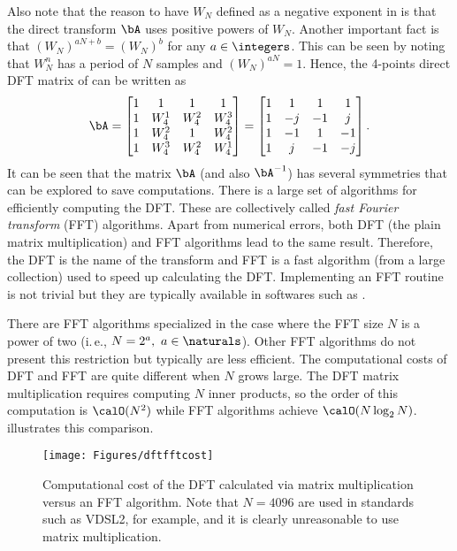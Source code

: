 Also note that the reason to have $W_N$ defined as a negative exponent in  is that the direct transform $\bA$ uses positive powers of $W_N$.
Another important fact is that $(W_N)^{aN+b}=(W_N)^{b}$ for any $a \in \integers$. This can be seen by noting that $W_N^n$ has a period of $N$ samples and $(W_N)^{aN} = 1$. Hence, the 4-points direct DFT matrix of  can be written as
\[\bA = 
    \begin{bmatrix}
    1 & 1 & 1 & 1\\
    1 & W_4^{1} & W_4^{2} & W_4^{3} \\
    1 & W_4^{2} & 1 & W_4^{2} \\
    1 & W_4^{3} & W_4^{2} & W_4^{1} \\
    \end{bmatrix}
=
    \begin{bmatrix}
    1 & 1 & 1 & 1\\
    1 & -j & -1 & j \\
    1 & -1 & 1 & -1 \\
    1 & j & -1 & -j \\
    \end{bmatrix}
.\]
It can be seen that the matrix $\bA$ (and also $\bA^{-1}$) has several symmetries that can be explored to save computations. There is a large set of algorithms for efficiently computing the DFT. These are collectively called \emph{fast Fourier transform} (FFT) algorithms.
Apart from numerical errors, both DFT (the plain matrix multiplication) and FFT algorithms lead to the same result.  Therefore, the DFT is the name of the transform and FFT is a fast algorithm (from a large collection) used to speed up calculating the DFT. Implementing an FFT routine is not trivial but they are typically available in softwares such as {\matlab}. 

There are FFT algorithms specialized in the case where the FFT size $N$ is a power of two (i.\,e., $N=2^a,~a \in \naturals$). Other FFT algorithms do not present this restriction but typically are less efficient. The computational costs of DFT and FFT are quite different when $N$ grows large. The DFT matrix multiplication requires computing $N$ inner products, so the order of this computation is $\calO(N^2)$ while FFT algorithms achieve $\calO(N \log_2N)$.  illustrates this comparison.

\begin{figure}[!htb]
        \centering
                \texttt{[image: Figures/dftfftcost]}          
        \caption{Computational cost of the DFT calculated via matrix multiplication versus an FFT algorithm. Note that $N=4096$ are used in standards such as VDSL2, for example, and it is clearly unreasonable to use matrix multiplication.\label{fig:dftfftcost}}
\end{figure}



